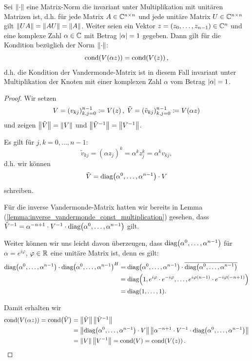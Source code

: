 \begin{lemma}
    Sei $\left\lVert \cdot \right\rVert$ eine Matrix-Norm die invariant unter Multiplikation mit unitären
    Matrizen ist, d.h. für jede Matrix $A \in \mathbb{C}^{n\times n}$ und jede
    unitäre Matrix $U \in \mathbb{C}^{n\times n}$ gilt $\left\lVert UA \right\rVert = \left\lVert AU \right\rVert = \left\lVert A \right\rVert$.
    Weiter seien ein Vektor $z = (z_0, \dots, z_{n-1}) \in \mathbb{C}^n$ und eine
    komplexe Zahl $\alpha \in \mathbb{C}$ mit Betrag $\left\lvert \alpha \right\rvert = 1$ gegeben.
    Dann gilt für die Kondition bezüglich der Norm $\left\lVert \cdot \right\rVert$:
    \[
        \text{cond}\! \left( V \! \left( \alpha z \right) \right) = \text{cond}\! \left( V \! \left( z \right) \right),
    \]
    d.h. die Kondition der Vandermonde-Matrix ist in diesem Fall invariant
    unter Multiplikation der Knoten mit einer komplexen Zahl $\alpha$ vom
    Betrag $\left\lvert \alpha \right\rvert = 1$.
\end{lemma}

\begin{proof}
    Wir setzen
    \[
        V = (v_{kj})_{k,j=0}^{n-1} \coloneqq V \! \left( z \right), \;
        \tilde{V} = (\tilde{v}_{kj})_{k,j=0}^{n-1} \coloneqq V \! \left( \alpha z \right)
    \]
    und zeigen $\left\lVert \tilde{V} \right\rVert = \left\lVert V \right\rVert$ und
    $\left\lVert \tilde{V}^{-1} \right\rVert = \left\lVert V^{-1} \right\rVert$.

    \noindent Es gilt für $j,k = 0,\dots,n-1$:
    \[
        \tilde{v}_{kj} = (\alpha z_j)^k = \alpha^k z_j^k = \alpha^k v_{kj},
    \]
    d.h. wir können
    \[
        \tilde{V} = \text{diag$ \left( \alpha^0, \dots, \alpha^{n-1} \right)$} \cdot V
    \]
    schreiben.

    \noindent Für die inverse Vandermonde-Matrix hatten wir bereits in
    Lemma (\ref{lemma:inverse_vandermonde_const_multiplication})
    gesehen, dass $ \tilde{V}^{-1} = \alpha^{-n+1} \cdot V^{-1} \cdot \text{diag$ \left( \alpha^{0}, \dots, \alpha^{n-1} \right)$} $ gilt.

    \noindent Weiter können wir uns leicht davon überzeugen, dass
    $\text{diag$ \left( \alpha^0, \dots, \alpha^{n-1} \right)$}$
    für $\alpha = e^{i\varphi}$, $\varphi \in \mathbb{R}$
    eine unitäre Matrix ist, denn es gilt:
    \[
        \begin{split}
               \text{diag$ \left( \alpha^0, \dots, \alpha^{n-1} \right)$} \cdot \text{diag$ \left( \alpha^0, \dots, \alpha^{n-1} \right)$}^{H}
            &= \text{diag$ \left( \alpha^0, \dots, \alpha^{n-1} \right)$} \cdot \overline{\text{diag$ \left( \alpha^0, \dots, \alpha^{n-1} \right)$}}\\
            &= \text{diag$ \left( 1, e^{i\varphi} \cdot e^{-i\varphi}, \dots, e^{i\varphi (n-1)} \cdot e^{-i \varphi (-n+1)} \right)$}\\
            &= \text{diag$ \left( 1, \dots, 1 \right)$}.
        \end{split}
    \]

    \noindent Damit erhalten wir
    \[
        \begin{split}
            \text{cond}\! \left( V \! \left( \alpha z \right) \right)
            = \text{cond}\! \left( \tilde{V} \right)
            &= \left\lVert \tilde{V} \right\rVert \left\lVert \tilde{V}^{-1} \right\rVert\\
            &= \left\lVert \text{diag$ \left( \alpha^0, \dots, \alpha^{n-1} \right)$} \cdot V \right\rVert \left\lVert \alpha^{-n+1} \cdot V^{-1} \cdot \text{diag$ \left( \alpha^0, \dots, \alpha^{n-1} \right)$} \right\rVert\\
            &= \left\lVert V \right\rVert \left\lVert V^{-1} \right\rVert
            = \text{cond}\! \left( V \right) = \text{cond}\! \left( V \! \left( z \right) \right).
        \end{split}
    \]
\end{proof}

